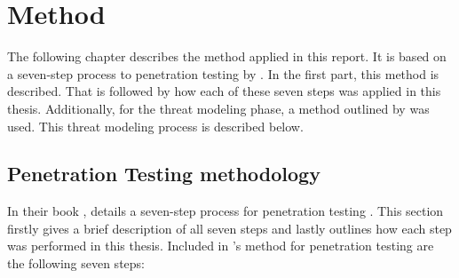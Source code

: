 \chapter{Method} \label{ch:method}
The following chapter describes the method applied in this report. It is based on a seven-step process to penetration testing by \textcite{weidman2014}. In the first part, this method is described. That is followed by how each of these seven steps was applied in this thesis. Additionally, for the threat modeling phase, a method outlined by \textcite{guzman2017iot} was used. This threat modeling process is described below.

\section{Penetration Testing methodology}
In their book , \citeauthor{weidman2014} details a seven-step process for penetration testing \cite{weidman2014}. This section firstly gives a brief description of all seven steps and lastly outlines how each step was performed in this thesis. Included in \citeauthor{weidman2014}'s method for penetration testing are the following seven steps:

